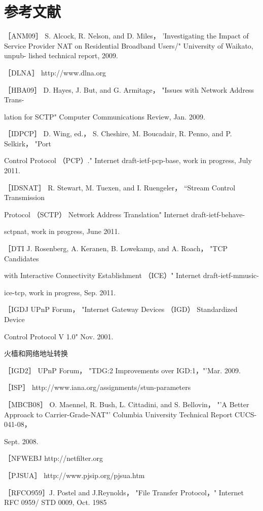 \section{参考文献}

［ANM09］ S. Alcock, R. Nelson, and D. Miles， 'Investigating the Impact of Service
Provider NAT on Residential Broadband Users/" University of Waikato, unpub-
lished technical report, 2009.

［DLNA］ http://www.dlna.org

［HBA09］ D. Hayes, J. But, and G. Armitage， "Issues with Network Address Trans-

lation for SCTP" Computer Communications Review, Jan. 2009.

［IDPCP］ D. Wing, ed.， S. Cheshire, M. Boucadair, R. Penno, and P. Selkirk， "Port

Control Protocol （PCP）." Internet draft-ietf-pcp-base, work in progress, July 2011.

［IDSNAT］ R. Stewart, M. Tuexen, and I. Ruengeler， “Stream Control Transmission

Protocol （SCTP） Network Address Translation" Internet draft-ietf-behave-

sctpnat, work in progress, June 2011.

［DTI J. Rosenberg, A. Keranen, B. Lowekamp, and A. Roach， "TCP Candidates

with Interactive Connectivity Establishment （ICE）" Internet draft-ietf-mmusic-

ice-tcp, work in progress, Sep. 2011.

［IGDJ UPnP Forum， "Internet Gateway Devices （IGD） Standardized Device

Control Protocol V 1.0" Nov. 2001.

火樯和网络地址转换

［IGD2］ UPnP Forum， "TDG:2 Improvements over IGD:1，"'Mar. 2009.

［ISP］ http://www.iana.org/assignments/stun-parameters

［MBCB08］ O. Maennel, R. Bush, L. Cittadini, and S. Bellovin， "'A Better Approack
to Carrier-Grade-NAT"' Columbia University Technical Report CUCS-041-08，

Sept. 2008.

［NFWEBJ http://netfilter.org

［PJSUA］ http://www.pjsip.org/pjsua.htm

［RFCO959］J. Postel and J.Reynolds， "File Transfer Protocol，" Internet RFC 0959/
STD 0009, Oct. 1985

